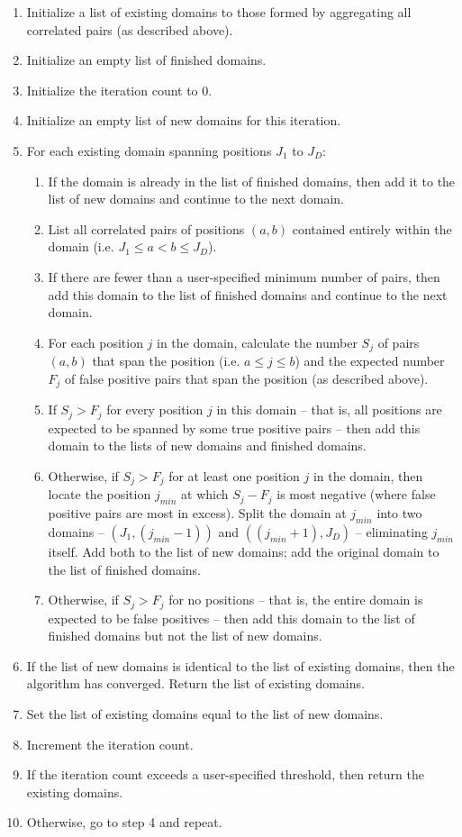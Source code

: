 \documentclass[11pt]{article}
\begin{document}
\begin{enumerate}
    \item Initialize a list of existing domains to those formed by aggregating all correlated pairs (as described above).
    \item Initialize an empty list of finished domains.
    \item Initialize the iteration count to 0.
    \item Initialize an empty list of new domains for this iteration.
    \item For each existing domain spanning positions $J_1$ to $J_D$:
    \begin{enumerate}
        \item If the domain is already in the list of finished domains, then add it to the list of new domains and continue to the next domain.
        \item List all correlated pairs of positions $(a, b)$ contained entirely within the domain (i.e. $J_1 \le a < b \le J_D$).
        \item If there are fewer than a user-specified minimum number of pairs, then add this domain to the list of finished domains and continue to the next domain.
        \item For each position $j$ in the domain, calculate the number $S_j$ of pairs $(a, b)$ that span the position (i.e. $a \le j \le b$) and the expected number $F_j$ of false positive pairs that span the position (as described above).
        \item If $S_j > F_j$ for every position $j$ in this domain -- that is, all positions are expected to be spanned by some true positive pairs -- then add this domain to the lists of new domains and finished domains.
        \item Otherwise, if $S_j > F_j$ for at least one position $j$ in the domain, then locate the position $j_{min}$ at which $S_j - F_j$ is most negative (where false positive pairs are most in excess). Split the domain at $j_{min}$ into two domains -- $(J_1, (j_{min} - 1))$ and $((j_{min} + 1), J_D)$ -- eliminating $j_{min}$ itself. Add both to the list of new domains; add the original domain to the list of finished domains.
        \item Otherwise, if $S_j > F_j$ for no positions -- that is, the entire domain is expected to be false positives -- then add this domain to the list of finished domains but not the list of new domains.
    \end{enumerate}
    \item If the list of new domains is identical to the list of existing domains, then the algorithm has converged. Return the list of existing domains.
    \item Set the list of existing domains equal to the list of new domains.
    \item Increment the iteration count.
    \item If the iteration count exceeds a user-specified threshold, then return the existing domains.
    \item Otherwise, go to step 4 and repeat.
\end{enumerate}
\end{document}
